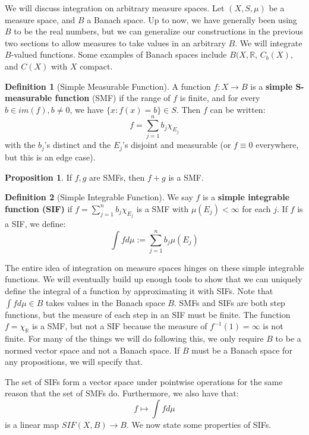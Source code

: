 \documentclass[11pt, oneside]{amsart}   	%
\theoremstyle{definition}
\newtheorem{definition}{Definition}[section]
\newtheorem{prop}{Proposition}[section]
\begin{document}
	We will discuss integration on arbitrary measure spaces. Let $(X, S, \mu)$ be a measure space, and $B$ a Banach 
	space. Up to now, we have generally been using $B$ to be the real numbers, but we can generalize our constructions 
	in the previous two sections to allow measures to take values in an arbitrary $B$. We will integrate $B$-valued functions. 
	Some examples of Banach spaces include $B(X, \mathbb R$, $C_b(X)$, and $C(X)$ with $X$ compact. 
	
	\begin{definition}[Simple Measurable Function]
		A function $f : X\rightarrow B$ is a \textbf{simple S-measurable function} (SMF) if the range of $f$ is finite, and for 
		every $b\in im(f), b\neq 0$, we have $\{x : f(x) = b\}\in S$. Then $f$ can be written:
		$$
			f = \sum_{j = 1}^n b_j \chi_{E_j}
		$$
		with the $b_j$'s distinct and the $E_j$'s disjoint and measurable (or $f\equiv 0$ everywhere, but this is an edge 
		case).
	\end{definition}
	
	\begin{prop}
		If $f, g$ are SMFs, then $f + g$ is a SMF.
	\end{prop}
	
	\begin{definition}[Simple Integrable Function]
		We say $f$ is a \textbf{simple integrable function (SIF)} if $f = \sum_{j = 1}^nb_j\chi_{E_j}$ is a SMF with 
		$\mu(E_j) < \infty$ for each $j$. If $f$ is a SIF, we define:
		$$
			\int fd\mu := \sum_{j = 1}^nb_j\mu(E_j)
		$$
	\end{definition}
	
	The entire idea of integration on measure spaces hinges on these simple integrable functions. We will eventually 
	build up enough tools to show that we can uniquely define the integral of a function by approximating it with SIFs. 
	Note that $\int fd\mu\in B$ takes values in the Banach space $B$. SMFs and SIFs are both step functions, but the 
	measure of each step in an SIF must be finite. The function $f = \chi_{\mathbb R}$ is a SMF, but not a SIF because 
	the measure of $f^{-1}(1) = \infty$ is not finite. For many of the things we will do following this, we only require $B$ to 
	be a normed vector space and not a Banach space. If $B$ must be a Banach space for any propositions, we will specify 
	that. 
	
	The set of SIFs form a vector space under pointwise operations for the same reason that the set of SMFs do. 
	Furthermore, we also have that:
	$$
		f\mapsto\int fd\mu
	$$
	is a linear map $SIF(X, B)\rightarrow B$. We now state some properties of SIFs.
	
\end{document}
